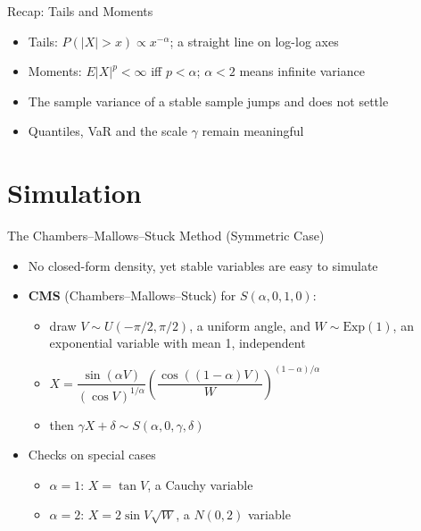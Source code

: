 \begin{frame}{Recap: Tails and Moments}
\itemsize{\small}
\begin{itemize}
    \item Tails: $P(|X| > x) \propto x^{-\alpha}$; a straight line on log-log axes
    \item Moments: $E|X|^p < \infty$ iff $p < \alpha$; $\alpha < 2$ means infinite variance
    \item The sample variance of a stable sample jumps and does not settle
    \item Quantiles, VaR and the scale $\gamma$ remain meaningful
\end{itemize}
\end{frame}


\section{Simulation}

\begin{frame}{The Chambers--Mallows--Stuck Method (Symmetric Case)}
\itemsize{\small}
\begin{itemize}
    \item No closed-form density, yet stable variables are easy to simulate 
    \item \textbf{CMS} (Chambers--Mallows--Stuck) for $S(\alpha, 0, 1, 0)$:
    \begin{itemize}
        \item draw $V \sim U(-\pi/2, \pi/2)$, a uniform angle, and $W \sim \mathrm{Exp}(1)$, an exponential variable with mean 1, independent
        \item $X = \dfrac{\sin(\alpha V)}{(\cos V)^{1/\alpha}} \left(\dfrac{\cos((1 - \alpha)V)}{W}\right)^{(1 - \alpha)/\alpha}$
        \item then $\gamma X + \delta \sim S(\alpha, 0, \gamma, \delta)$
    \end{itemize}
    \item Checks on special cases
    \begin{itemize}
        \item $\alpha = 1$: $X = \tan V$, a Cauchy variable
        \item $\alpha = 2$: $X = 2\sin V\sqrt{W}$, a $N(0, 2)$ variable
    \end{itemize}
\end{itemize}
\end{frame}

